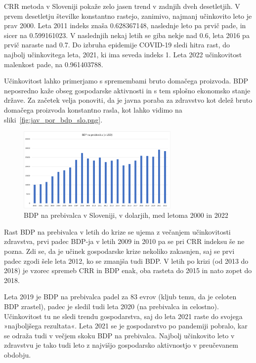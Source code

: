 \documentclass[12pt,a4paper]{article}
\theoremstyle{definition}
\begin{document}
  CRR metoda v Sloveniji pokaže zelo jasen trend v zadnjih dveh desetletjih. 
  V prvem desetletju številke konstantno rastejo, zanimivo, najmanj učinkovito leto je prav 2000. 
  Leta 2011 indeks znaša 0.628367148, naslednje leto pa prvič pade, in sicer na 0.599161023.  
  V naslednjih nekaj letih se giba nekje nad 0.6, leta 2016 pa prvič naraste nad 0.7. 
  Do izbruha epidemije COVID-19 sledi hitra rast, do najbolj učinkovitega leta, 2021, ki ima seveda indeks 1. 
  Leta 2022 učinkovitost malenkost pade, na 0.961403788.

  Učinkovitost lahko primerjamo s spremembami bruto domačega proizvoda. 
  BDP neposredno kaže obseg gospodarske aktivnosti in s tem splošno ekonomsko stanje države. 
  Za začetek velja ponoviti, da je javna poraba za zdravstvo kot delež bruto domačega proizvoda konstantno rasla, kot lahko vidimo na sliki~\ref{fig:jav_por_bdp_slo.png}. %

\begin{figure}[H]
    \centering
    \includegraphics[width=0.7\textwidth]{bnp_pbr_slo.png}
    \caption{BDP na prebivalca v Sloveniji, v dolarjih, med letoma 2000 in 2022}
    \label{fig:bnp_pbr_slo.png}
\end{figure}

Rast BDP na prebivalca v letih do krize se ujema z večanjem učinkovitosti zdravstva, prvi padec BDP-ja v letih 2009 in 2010 pa se pri CRR indeksu še ne pozna. 
Zdi se, da je učinek gospodarske krize nekoliko zakasnjen, saj se prvi padec zgodi šele leta 2012, ko se zmanjša tudi BDP. 
V letih po krizi (od 2013 do 2018) je vzorec spremeb CRR in BDP enak, oba rasteta do 2015 in nato zopet do 2018. 

Leta 2019 je BDP na prebivalca padel za 83 evrov (kljub temu, da je celoten BDP zrastel), padec je sledil tudi leta 2020 (na prebivalca in celostno). 
Učinkovitost tu ne sledi trendu gospodarstva, saj do leta 2021 raste do svojega »najboljšega rezultata«. 
Leta 2021 se je gospodarstvo po pandemiji pobralo, kar se odraža tudi v večjem skoku BDP na prebivalca. 
Najbolj učinkovito leto v zdravstvu je tako tudi leto z najvišjo gospodarsko aktivnostjo v preučevanem obdobju.
\end{document}
